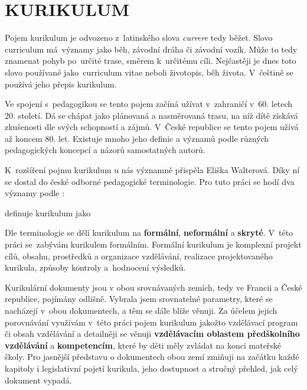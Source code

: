 \chapter{KURIKULUM}

%
Pojem kurikulum je odvozeno z latinského slova \textit{currere} tedy běžet.  Slovo curriculum má významy jako běh, závodní dráha či závodní vozík. Může to tedy znamenat pohyb po určité trase, směrem k určitému cíli. Nejčastěji je dnes toto slovo používané jako curriculum vitae neboli životopis, běh života. V češtině se používá jeho přepis kurikulum. 

Ve spojení s pedagogikou se tento pojem začíná užívat v zahraničí v 60. letech 20. století. Dá se chápat jako plánovaná a nasměrovaná trasu, na níž dítě získává zkušenosti dle svých schopností a zájmů. V České republice se tento pojem užívá až koncem 80. let. Existuje mnoho jeho definic a významů podle různých pedagogických koncepcí a názorů samostatných autorů.

K rozšíření pojmu kurikulum u nás významně přispěla Eliška Walterová. Díky ní se dostal do české odborné pedagogické terminologie. Pro tuto práci se hodí dva významy podle \citet[s.~15]{Walterova}:



\citet{Prucha} definuje kurikulum jako 

Dle terminologie se dělí kurikulum na \textbf{formální}, \textbf{neformální} a \textbf{skryté}. V této práci se zabývám kurikulem formálním. Formální kurikulum je komplexní projekt cílů, obsahu, prostředků a organizace vzdělávání, realizace projektovaného kurikula, způsoby kontroly a hodnocení výsledků.

Kurikulární dokumenty jsou v obou srovnávaných zemích, tedy ve Francii a České republice, pojímány odlišně. Vybrala jsem srovnatelné parametry, které se nacházejí v obou dokumentech, a těm se dále blíže věnuji. Za účelem jejich porovnávání využívám v této práci pojem kurikulum jakožto vzdělávací program či obsah vzdělávání a detailněji se věnuji \textbf{vzdělávacím oblastem předškolního vzdělávání} a \textbf{kompetencím}, které by děti měly zvládat na konci mateřské školy. Pro jasnější představu o dokumentech obou zemí zmiňuji na začátku každé kapitoly i legislativní pojetí kurikula, jeho dostupnost a stručný přehled, jak celý dokument vypadá. 

